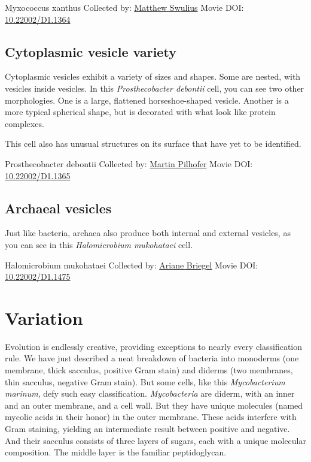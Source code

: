 \documentclass[]{tufte-book}
\begin{document}
\hypertarget{htmlwidget-1dd14793dcf76953521e}{}

\label{fig:2-4c}Myxococcus xanthus Collected by: \protect\hyperlink{matthew_swulius}{Matthew Swulius} Movie DOI: \href{https://doi.org/10.22002/D1.1364}{10.22002/D1.1364}

\hypertarget{Cytoplasmic_vesicle_variety}{%
\subsection{Cytoplasmic vesicle variety}\label{Cytoplasmic_vesicle_variety}}

Cytoplasmic vesicles exhibit a variety of sizes and shapes. Some are nested, with vesicles inside vesicles. In this \emph{Prosthecobacter debontii} cell, you can see two other morphologies. One is a large, flattened horseshoe-shaped vesicle. Another is a more typical spherical shape, but is decorated with what look like protein complexes.

This cell also has unusual structures on its surface that have yet to be identified.



\hypertarget{htmlwidget-7f60bd400462bf01caa1}{}

\label{fig:2-4d}Prosthecobacter debontii Collected by: \protect\hyperlink{martin_pilhofer}{Martin Pilhofer} Movie DOI: \href{https://doi.org/10.22002/D1.1365}{10.22002/D1.1365}

\hypertarget{Archaeal_vesicles}{%
\subsection{Archaeal vesicles}\label{Archaeal_vesicles}}

Just like bacteria, archaea also produce both internal and external vesicles, as you can see in this \emph{Halomicrobium mukohataei} cell.



\hypertarget{htmlwidget-0d6ac66786a9ae289ccc}{}

\label{fig:2-4e}Halomicrobium mukohataei Collected by: \protect\hyperlink{ariane_briegel}{Ariane Briegel} Movie DOI: \href{https://doi.org/10.22002/D1.1475}{10.22002/D1.1475}

\hypertarget{variation}{%
\section{Variation}\label{variation}}

Evolution is endlessly creative, providing exceptions to nearly every classification rule. We have just described a neat breakdown of bacteria into monoderms (one membrane, thick sacculus, positive Gram stain) and diderms (two membranes, thin sacculus, negative Gram stain). But some cells, like this \emph{Mycobacterium marinum}, defy such easy classification. \emph{Mycobacteria} are diderm, with an inner and an outer membrane, and a cell wall. But they have unique molecules (named mycolic acids in their honor) in the outer membrane. These acids interfere with Gram staining, yielding an intermediate result between positive and negative. And their sacculus consists of three layers of sugars, each with a unique molecular composition. The middle layer is the familiar peptidoglycan.
\end{document}
